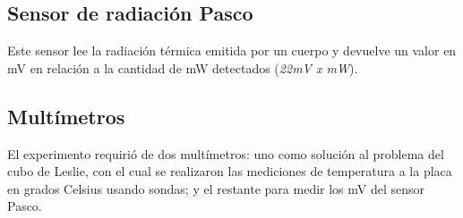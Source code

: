 \documentclass[a4paper]{article}
\begin{document}
\begin{multicols}{2}
        \subsection{Sensor de radiación Pasco}
            \indent Este sensor lee la radiación térmica emitida por un cuerpo y devuelve un valor en mV en relación a la cantidad de mW detectados (\textit{22mV x mW}). \\
            \vspace{6.5cm}

        \subsection{Multímetros}
            \indent El experimento requirió de dos multímetros: uno como solución al problema del cubo de Leslie, con el cual se realizaron las mediciones de temperatura a la placa en grados Celsius usando sondas; y el restante para medir los mV del sensor Pasco.
            \vspace{5cm}

\end{multicols}
\end{document}
